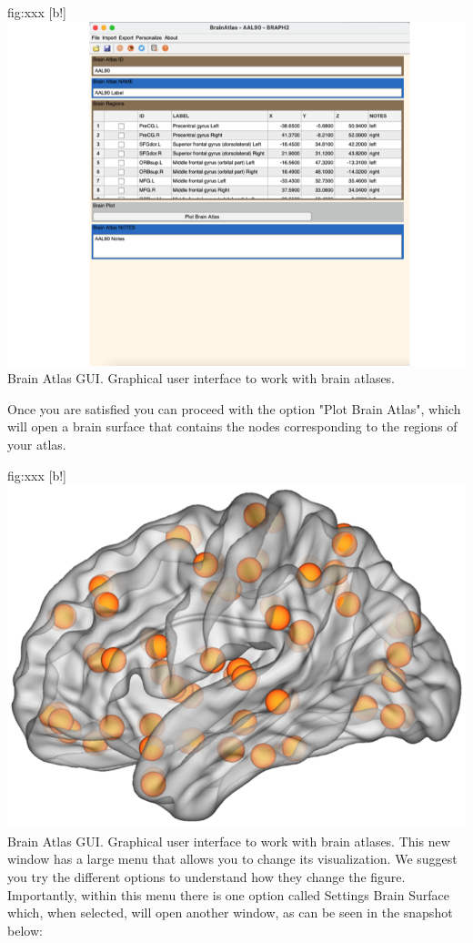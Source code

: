\documentclass{tufte-handout}
\begin{document}
	{fig:xxx}
	{
	[b!]
	\includegraphics{tut_ba/fig8.png}
	}
	{Brain Atlas GUI.}
	{
	Graphical user interface to work with brain atlases. 
	}

Once you are satisfied you can proceed with the option "Plot Brain Atlas", which will open a brain surface that contains the nodes corresponding to the regions of your atlas.

	{fig:xxx}
	{
	[b!]
	\includegraphics{tut_ba/fig2.png}
	}
	{Brain Atlas GUI.}
	{
	Graphical user interface to work with brain atlases. 
	}
This new window has a large menu that allows you to change its visualization. We suggest you try the different options to understand how they change the figure. Importantly, within this menu there is one option called Settings Brain Surface which, when selected, will open another window, as can be seen in the snapshot below:
\end{document}
